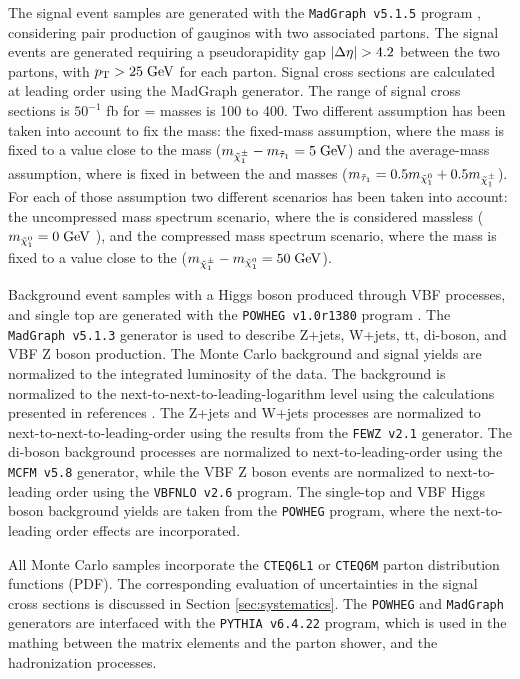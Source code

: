 The signal event samples are generated with the \texttt{MadGraph v5.1.5} program \cite{Alwall:2011uj}, considering pair production of gauginos with two associated partons. The signal events are generated requiring a pseudorapidity gap $|\Delta\eta| > 4.2$ between the two partons, with $p_{\text{T}} > 25\;\text{Ge}\kern-0.06667em\text{V}$ for each parton. Signal cross sections are calculated at leading order using the MadGraph generator. The range of signal cross sections is $50^{-1}$ fb for \charginopm = \neutralinotwo masses is 100 to 400\gev. Two different assumption has been taken into account to fix the \stau mass: the fixed-mass assumption, where the mass is fixed to a value close to the \charginopm mass ($m_{\tilde{\chi}^{\pm}_{1}} - m_{\tilde{\tau}_{1}} = 5\;\text{Ge}\kern-0.06667em\text{V}$) and the average-mass assumption, where is fixed in between the \charginopm and \neutralinoone masses ($m_{\tilde{\tau}_{1}} = 0.5 m_{\tilde{\chi}^{0}_{1}} + 0.5 m_{\tilde{\chi}^{\pm}_{1}} $). For each of those assumption two different scenarios has been taken into account: the uncompressed mass spectrum scenario, where the \neutralinoone is considered massless ($m_{\tilde{\chi}^{0}_{1}} = 0\;\text{Ge}\kern-0.06667em\text{V}$ ), and the compressed mass spectrum scenario, where the \neutralinoone mass is fixed to a value close to the \charginopm ($m_{\tilde{\chi}^{\pm}_{1}} - m_{\tilde{\chi}^{0}_{1}} = 50\;\text{Ge}\kern-0.06667em\text{V}$).

Background event samples with a Higgs boson produced through VBF processes, and single top are generated with the \texttt{POWHEG v1.0r1380} program \cite{Frixione:2007vw}. 
The \texttt{MadGraph v5.1.3} generator is used to describe Z+jets, W+jets, tt, di-boson, and VBF Z boson production. The Monte Carlo background and signal yields are normalized to the integrated luminosity of the data. 
The \ttbar background is normalized to the next-to-next-to-leading-logarithm level using the calculations presented in references \cite{Czakon:2013goa,Melnikov:2006kv}. 
The Z+jets and W+jets processes are normalized to next-to-next-to-leading-order using the results from the \texttt{FEWZ v2.1} \cite{Gavin:2010az} generator. 
The di-boson background processes are normalized to next-to-leading-order using the \texttt{MCFM v5.8} \cite{Campbell:2010ff} generator, while the VBF Z boson events are normalized to next-to-leading order using the \texttt{VBFNLO v2.6} \cite{Arnold:2008rz,Arnold:2011wj}program. 
The single-top and VBF Higgs boson background yields are taken from the \texttt{POWHEG} program, where the next-to-leading order effects are incorporated.

All Monte Carlo samples incorporate the \texttt{CTEQ6L1} \cite{Pumplin:2002vw} or \texttt{CTEQ6M} \cite{Nadolsky:2008zw} parton distribution functions (PDF). The corresponding evaluation of uncertainties in the signal cross sections is discussed in Section \ref{sec:systematics}. The \texttt{POWHEG} and \texttt{MadGraph} generators are interfaced with the \texttt{PYTHIA v6.4.22} \cite{Sjostrand:2006za} program, which is used in the mathing between the matrix elements and the parton shower, and the hadronization processes. 


